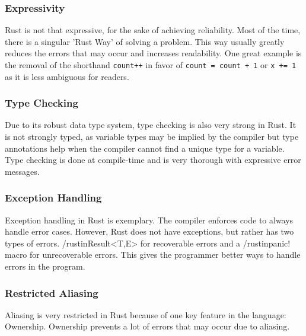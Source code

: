 \documentclass{article}
\newcommand{\rustin}[1]{\texttt{#1}}
\begin{document}
  \subsubsection{Expressivity}
  Rust is not that expressive, for the sake of achieving reliability. Most of
  the time, there is a singular 'Rust Way' of solving a problem. This way
  usually greatly reduces the errors that may occur and increases readability.
  One great example is the removal of the shorthand \texttt{count++} in
  favor of \rustin{count = count + 1} or \rustin{x += 1} as it is less ambiguous
  for readers.


  \subsubsection{Type Checking}
  Due to its robust data type system, type checking is also very strong in Rust.
  It is not strongly typed, as variable types may be implied by the compiler but
  type annotations help when the compiler cannot find a unique type for a
  variable. Type checking is done at compile-time and is very thorough with
  expressive error messages.

  \subsubsection{Exception Handling}
  Exception handling in Rust is exemplary. The compiler enforces code to always
  handle error cases. However, Rust does not have exceptions, but rather has two
  types of errors. /rustin{Result<T,E>} for recoverable errors and a
  /rustin{panic!} macro for unrecoverable errors. This gives the programmer
  better ways to handle errors in the program.

  \subsubsection{Restricted Aliasing}
  Aliasing is very restricted in Rust because of one key feature in the
  language: Ownership. Ownership prevents a lot of errors that may occur due to
  aliasing.

  \newpage
  \nocite{*} \printbibliography[heading=bibintoc,title={References}]{}
\end{document}
